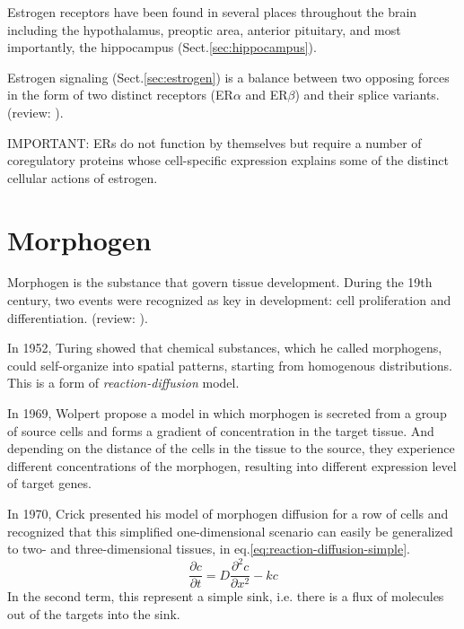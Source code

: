 Estrogen receptors have been found in several places throughout the brain
including the hypothalamus, preoptic area, anterior pituitary, and most
importantly, the hippocampus (Sect.\ref{sec:hippocampus}).

Estrogen signaling (Sect.\ref{sec:estrogen}) is a balance between two opposing
forces in the form of two distinct receptors (ER$\alpha$ and ER$\beta$) and their splice variants.
(review: \citep{heldring2007}).

IMPORTANT:  ERs do not function by themselves but require a number of
coregulatory proteins whose cell-specific expression explains some of the
distinct cellular actions of estrogen.


\section{Morphogen}
\label{sec:morphogen}

Morphogen is the substance that govern tissue development.
During the 19th century, two events were recognized as key in development: cell
proliferation and differentiation. (review: \citep{wartlick2009}).

In 1952, Turing showed that chemical substances, which he called morphogens,
could self-organize into spatial patterns, starting from homogenous
distributions. This is a form of {\it reaction-diffusion} model.

In 1969, Wolpert propose a model in which morphogen is secreted from a group of
source cells and forms a gradient of concentration in the target tissue. And
depending on the distance of the cells in the tissue to the source, they
experience different concentrations of the morphogen, resulting into different
expression level of target genes.

In 1970, Crick presented his model of morphogen diffusion for a row of cells and
recognized that this simplified one-dimensional scenario can easily be
generalized to two- and three-dimensional
tissues, in eq.\ref{eq:reaction-diffusion-simple}. 
\begin{equation}
\frac{\partial c}{\partial t} = D \frac{\partial^2 c}{\partial x^2} - kc
\end{equation}
In the second term, this represent a simple sink, i.e. there is a flux of
molecules out of the targets into the sink.

